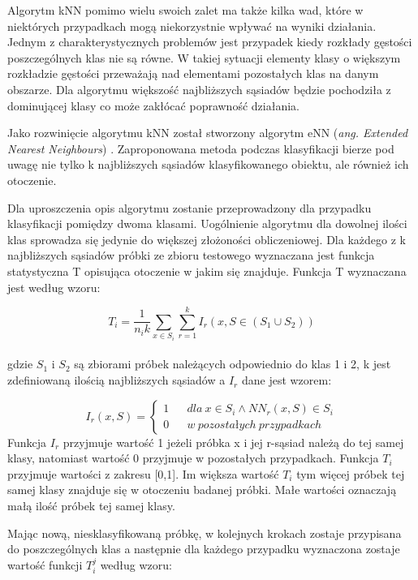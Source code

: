 \documentclass[12pt]{report}
\begin{document}
\large{Algorytm kNN pomimo wielu swoich zalet ma także kilka wad, które w niektórych przypadkach mogą niekorzystnie wpływać na wyniki działania. Jednym z charakterystycznych problemów jest przypadek kiedy rozkłady gęstości poszczególnych klas nie są równe. W takiej sytuacji elementy klasy o większym rozkładzie gęstości przeważają nad elementami pozostałych klas na danym obszarze. Dla algorytmu większość najbliższych sąsiadów będzie pochodziła z dominującej klasy co może zakłócać poprawność działania.

Jako rozwinięcie algorytmu kNN został stworzony algorytm eNN (\textit{ang. Extended Nearest Neighbours}) \cite{haibo-he}. Zaproponowana metoda podczas klasyfikacji bierze pod uwagę nie tylko k najbliższych sąsiadów klasyfikowanego obiektu, ale również ich otoczenie. 

Dla uproszczenia opis algorytmu zostanie przeprowadzony dla przypadku klasyfikacji pomiędzy dwoma klasami. Uogólnienie algorytmu dla dowolnej ilości klas sprowadza się jedynie do większej złożoności obliczeniowej. Dla każdego z k najbliższych sąsiadów próbki ze zbioru testowego wyznaczana jest funkcja statystyczna T opisująca otoczenie w jakim się znajduje. Funkcja T wyznaczana jest według wzoru:

\begin{equation}
T_{i} = \frac{1}{n_i k} {\sum_{x \in S_i} \sum_{r=1}^{k} I_r (x,S \in (S_1 \cup S_2))} 
\end{equation}\\
gdzie $S_1$ i $S_2$ są zbiorami próbek należących odpowiednio do klas 1 i 2, k jest zdefiniowaną ilością najbliższych sąsiadów a $I_r$ dane jest wzorem:

\begin{equation}
I_r(x,S) =\left\{\begin{matrix}
1 &&	dla\ x \in S_i \wedge NN_{r}(x,S) \in S_i
\\
0 &&	w\ pozostałych\ przypadkach
\end{matrix}\right.
\end{equation}
Funkcja $I_r$ przyjmuje wartość 1 jeżeli próbka x i jej r-sąsiad należą do tej samej klasy, natomiast wartość 0 przyjmuje w pozostałych przypadkach.
Funkcja $T_i$ przyjmuje wartości z zakresu [0,1]. Im większa wartość $T_i$ tym więcej próbek tej samej klasy znajduje się w otoczeniu badanej próbki. Małe wartości oznaczają małą ilość próbek tej samej klasy.

Mając nową, niesklasyfikowaną próbkę, w kolejnych krokach zostaje przypisana do poszczególnych klas a następnie dla każdego przypadku wyznaczona zostaje wartość funkcji $T_i^j$ według wzoru:

}
\end{document}
